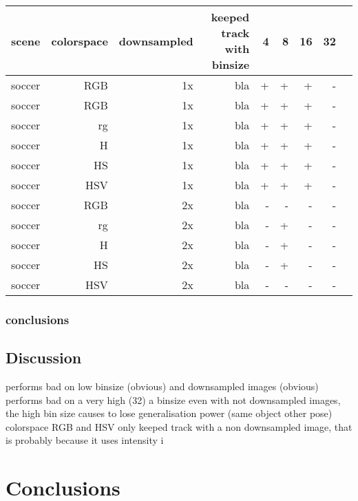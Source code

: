 \documentclass[a4paper,11pt]{article}
\begin{document}
	\begin{tabular}{l*{8}{r|}}
		scene	& 	colorspace	& downsampled & keeped track with binsize & 4 & 8 & 16 & 32\\
		\hline
		soccer 	& 	RGB	 		& 1x		  &			bla				  & + & + & +  &  -\\
		soccer 	& 	RGB	 		& 1x		  &			bla				  & + & + & +  &  -\\
		soccer 	& 	rg	 		& 1x 		  &			bla				  & + & + & +  &  -\\
		soccer 	& 	H	 		& 1x		  &			bla				  & + & + & +  &  -\\
		soccer 	& 	HS	 		& 1x		  &			bla				  & + & + & +  &  -\\
		soccer 	& 	HSV	 		& 1x		  &			bla				  & + & + & +  &  -\\
		soccer 	& 	RGB	 		& 2x		  &			bla				  & - & - & -  &  -\\
		soccer 	& 	rg	 		& 2x 		  &			bla				  & - & + & -  &  -\\
		soccer 	& 	H	 		& 2x		  &			bla				  & - & + & -  &  -\\
		soccer 	& 	HS	 		& 2x		  &			bla				  & - & + & -  &  -\\
		soccer 	& 	HSV	 		& 2x		  &			bla				  & - & - & -  &  -\\
	\end{tabular}	

	\subsubsection{conclusions}

\subsection{Discussion} %
		performs bad on low binsize (obvious) and downsampled images (obvious)\\

		performs bad on a very high (32) a binsize even with not downsampled
		images, the high bin size causes to lose generalisation power (same object other pose)\\
		
		colorspace RGB and HSV only keeped track with a non downsampled image,
		that is probably because it uses intensity i


\section{Conclusions} \label{sec:conc}
\end{document}
